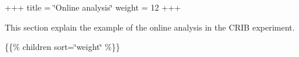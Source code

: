 +++ title = \char`\"{}\+Online analysis\char`\"{} weight = 12 +++

This section explain the example of the online analysis in the CRIB experiment.

\{\{\% children sort=\char`\"{}weight\char`\"{} \%\}\} 